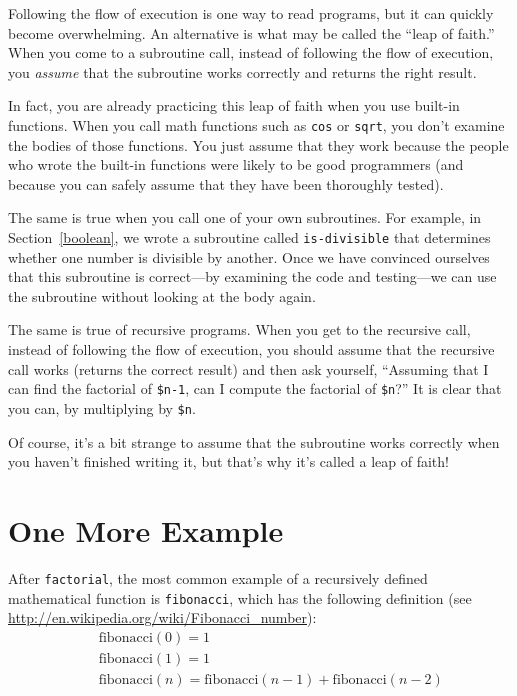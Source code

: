 Following the flow of execution is one way to read programs, but
it can quickly become overwhelming.  An alternative is what may 
be called the ``leap of faith.''  When you come to a
subroutine call, instead of following the flow of execution, you {\em
assume} that the subroutine works correctly and returns the right
result.

In fact, you are already practicing this leap of faith when you use
built-in functions.  When you call math functions such as {\tt cos} or {\tt sqrt},
you don't examine the bodies of those functions.  You just
assume that they work because the people who wrote the built-in
functions were likely to be good programmers (and because you 
can safely assume that they have been thoroughly tested).

The same is true when you call one of your own subroutines.  For
example, in Section~\ref{boolean}, we wrote a subroutine called 
\verb"is-divisible" that determines whether one number is divisible by
another.  Once we have convinced ourselves that this subroutine is
correct---by examining the code and testing---we can use the subroutine without looking at the body again.

The same is true of recursive programs.  When you get to the recursive
call, instead of following the flow of execution, you should assume
that the recursive call works (returns the correct result) and then ask
yourself, ``Assuming that I can find the factorial of \verb"$n-1", can I
compute the factorial of \verb"$n"?''  It is clear that you
can, by multiplying by \verb"$n".

Of course, it's a bit strange to assume that the subroutine works
correctly when you haven't finished writing it, but that's why
it's called a leap of faith!


\section{One More Example}
\label{one.more.example}

After {\tt factorial}, the most common example of a recursively
defined mathematical function is {\tt fibonacci}, which has the
following definition (see
  \url{http://en.wikipedia.org/wiki/Fibonacci_number}):
%
\begin{eqnarray*}
&& \mathrm{fibonacci}(0) = 1 \\
&& \mathrm{fibonacci}(1) = 1 \\
&& \mathrm{fibonacci}(n) = \mathrm{fibonacci}(n-1) + \mathrm{fibonacci}(n-2)
\end{eqnarray*}
%

